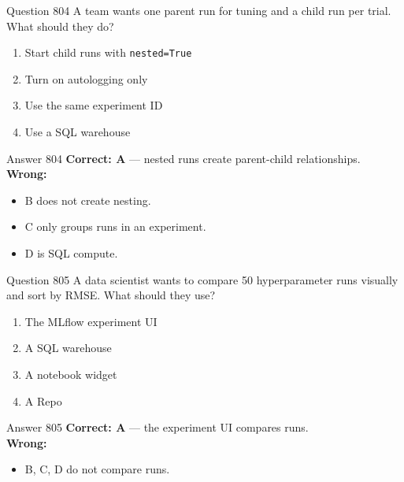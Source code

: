 \documentclass[aspectratio=169,11pt]{beamer}
\begin{document}
	\begin{frame}{Question 804}
		A team wants one parent run for tuning and a child run per trial. What should they do?
		\begin{enumerate}[label=\Alph*.]
			\item Start child runs with \texttt{nested=True}
			\item Turn on autologging only
			\item Use the same experiment ID
			\item Use a SQL warehouse
		\end{enumerate}
	\end{frame}
	\begin{frame}{Answer 804}
		\textbf{Correct: A} --- nested runs create parent-child relationships.\\
		\vspace{0.5em}
		\textbf{Wrong:}
		\begin{itemize}
			\item B does not create nesting.
			\item C only groups runs in an experiment.
			\item D is SQL compute.
		\end{itemize}
	\end{frame}
	
	\begin{frame}{Question 805}
		A data scientist wants to compare 50 hyperparameter runs visually and sort by RMSE. What should they use?
		\begin{enumerate}[label=\Alph*.]
			\item The MLflow experiment UI
			\item A SQL warehouse
			\item A notebook widget
			\item A Repo
		\end{enumerate}
	\end{frame}
	\begin{frame}{Answer 805}
		\textbf{Correct: A} --- the experiment UI compares runs.\\
		\vspace{0.5em}
		\textbf{Wrong:}
		\begin{itemize}
			\item B, C, D do not compare runs.
		\end{itemize}
	\end{frame}
	
\end{document}
